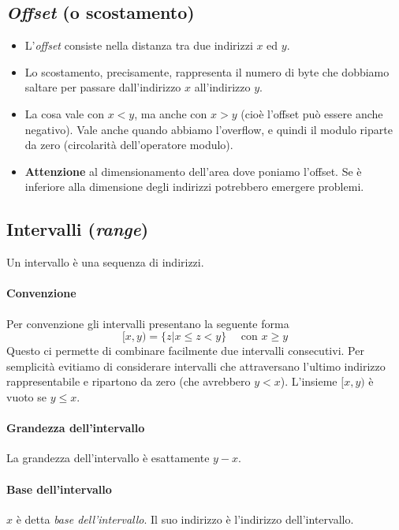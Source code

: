 \documentclass[11pt]{report}
\theoremstyle{definition}
\begin{document}
\subsection{\emph{Offset} (o scostamento)}
\begin{itemize}
\item L'\emph{offset} consiste nella distanza tra due indirizzi $x$ ed $y$. 
\item Lo scostamento, precisamente, rappresenta il numero di byte che dobbiamo saltare per passare dall'indirizzo $x$ all'indirizzo $y$. 
\item La cosa vale con $x<y$, ma anche con $x>y$ (cioè l'offset può essere anche negativo). Vale anche quando abbiamo l'overflow, e quindi il modulo riparte da zero (circolarità dell'operatore modulo).
\item \textbf{Attenzione} al dimensionamento dell'area dove poniamo l'offset. Se è inferiore alla dimensione degli indirizzi potrebbero emergere problemi.
\end{itemize}
\clearpage 

\subsection{Intervalli (\emph{range})} 
Un intervallo è una sequenza di indirizzi.
\paragraph{Convenzione}
Per convenzione gli intervalli presentano la seguente forma
\[[x,y)=\{z|x \leq z < y\}\,\,\,\,\,\,\,\,\text{con $x \geq y$}\]
Questo ci permette di combinare facilmente due intervalli consecutivi. Per semplicità evitiamo di considerare intervalli che attraversano l'ultimo indirizzo rappresentabile e ripartono da zero (che avrebbero $y<x$). L'insieme $[x,y)$ è vuoto se $y\leq x$.
\paragraph{Grandezza dell'intervallo} La grandezza dell'intervallo è esattamente $y-x$.
\paragraph{Base dell'intervallo} $x$ è detta \emph{base dell'intervallo}. Il suo indirizzo è l'indirizzo dell'intervallo.
\end{document}
